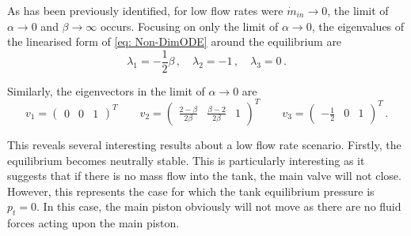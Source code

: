 As has been previously identified, for low flow rates were $\dot{m}_{in} \rightarrow 0$, the limit of $\alpha \rightarrow 0$ and $\beta \rightarrow \infty$ occurs. Focusing on only the limit of $\alpha \rightarrow 0$, the eigenvalues of the linearised form of \cref{eq: Non-DimODE} around the equilibrium are
~ %
\begin{equation*}
    \lambda_1 = - \frac{1}{2}\beta \, , \quad
    \lambda_2 = -1 \, , \quad
    \lambda_3 = 0 \, .
\end{equation*}

Similarly, the eigenvectors in the limit of $\alpha \rightarrow 0$ are
~ %
\begin{equation*}
    v_1 = \begin{pmatrix}
    0 & 0 & 1
    \end{pmatrix}^T \qquad
    v_2 = \begin{pmatrix}
    \frac{2 - \beta}{2\beta} & \frac{\beta - 2}{2\beta} & 1
    \end{pmatrix}^T \qquad
    v_3 = \begin{pmatrix}
    - \frac{1}{2} & 0 & 1
    \end{pmatrix}^T \, .
\end{equation*}

This reveals several interesting results about a low flow rate scenario. Firstly, the equilibrium becomes neutrally stable. This is particularly interesting as it suggests that if there is no mass flow into the tank, the main valve will not close. However, this represents the case for which the tank equilibrium pressure is $p_t = 0$. In this case, the main piston obviously will not move as there are no fluid forces acting upon the main piston.

